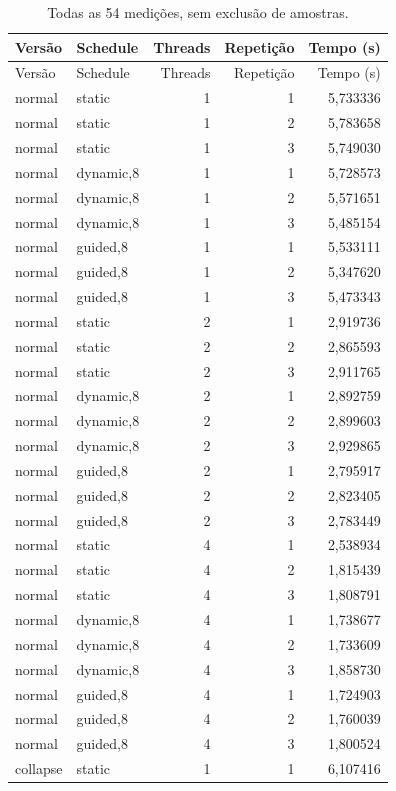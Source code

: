 \begin{longtable}{llrrr}
\caption{Todas as 54 medições, sem exclusão de amostras.}\\
\toprule Versão & Schedule & Threads & Repetição & Tempo (s)\\
\midrule\endfirsthead
\toprule Versão & Schedule & Threads & Repetição & Tempo (s)\\
\midrule\endhead
\bottomrule\endfoot
normal & static & 1 & 1 & 5,733336\\
normal & static & 1 & 2 & 5,783658\\
normal & static & 1 & 3 & 5,749030\\
normal & dynamic,8 & 1 & 1 & 5,728573\\
normal & dynamic,8 & 1 & 2 & 5,571651\\
normal & dynamic,8 & 1 & 3 & 5,485154\\
normal & guided,8 & 1 & 1 & 5,533111\\
normal & guided,8 & 1 & 2 & 5,347620\\
normal & guided,8 & 1 & 3 & 5,473343\\
normal & static & 2 & 1 & 2,919736\\
normal & static & 2 & 2 & 2,865593\\
normal & static & 2 & 3 & 2,911765\\
normal & dynamic,8 & 2 & 1 & 2,892759\\
normal & dynamic,8 & 2 & 2 & 2,899603\\
normal & dynamic,8 & 2 & 3 & 2,929865\\
normal & guided,8 & 2 & 1 & 2,795917\\
normal & guided,8 & 2 & 2 & 2,823405\\
normal & guided,8 & 2 & 3 & 2,783449\\
normal & static & 4 & 1 & 2,538934\\
normal & static & 4 & 2 & 1,815439\\
normal & static & 4 & 3 & 1,808791\\
normal & dynamic,8 & 4 & 1 & 1,738677\\
normal & dynamic,8 & 4 & 2 & 1,733609\\
normal & dynamic,8 & 4 & 3 & 1,858730\\
normal & guided,8 & 4 & 1 & 1,724903\\
normal & guided,8 & 4 & 2 & 1,760039\\
normal & guided,8 & 4 & 3 & 1,800524\\
collapse & static & 1 & 1 & 6,107416\\

\end{longtable}
